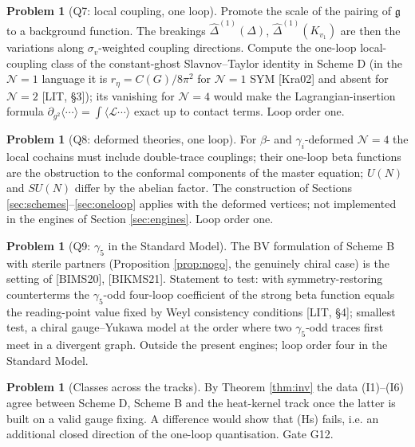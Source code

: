 \documentclass[11pt]{article}
\theoremstyle{definition}
\newtheorem{problem}[definition]{Problem}
\numberwithin{equation}{section}
\begin{document}
\begin{problem}[Q7: local coupling, one loop]
\label{q:Q7}
Promote the scale of the pairing of $\mathfrak g$ to a background function. The breakings $\widehat\Delta^{(1)}(\Delta)$, $\widehat\Delta^{(1)}(K_{v_1})$ are then the variations along $\sigma_v$-weighted coupling directions. Compute the one-loop local-coupling class of the constant-ghost Slavnov--Taylor identity in Scheme D (in the $\mathcal N=1$ language it is $r_\eta=C(G)/8\pi^2$ for $\mathcal N=1$ SYM [Kra02] and absent for $\mathcal N=2$ [LIT, §3]); its vanishing for $\mathcal N=4$ would make the Lagrangian-insertion formula $\partial_{g^2}\langle\cdots\rangle=\int\langle\mathscr L\cdots\rangle$ exact up to contact terms. Loop order one.
\end{problem}

\begin{problem}[Q8: deformed theories, one loop]
\label{q:Q8}
For $\beta$- and $\gamma_i$-deformed $\mathcal N=4$ the local cochains must include double-trace couplings; their one-loop beta functions are the obstruction to the conformal components of the master equation; $U(N)$ and $SU(N)$ differ by the abelian factor. The construction of Sections \ref{sec:schemes}--\ref{sec:oneloop} applies with the deformed vertices; not implemented in the engines of Section \ref{sec:engines}. Loop order one.
\end{problem}

\begin{problem}[Q9: $\gamma_5$ in the Standard Model]
\label{q:Q9}
The BV formulation of Scheme B with sterile partners (Proposition \ref{prop:nogo}, the genuinely chiral case) is the setting of [BIMS20], [BIKMS21]. Statement to test: with symmetry-restoring counterterms the $\gamma_5$-odd four-loop coefficient of the strong beta function equals the reading-point value fixed by Weyl consistency conditions [LIT, §4]; smallest test, a chiral gauge--Yukawa model at the order where two $\gamma_5$-odd traces first meet in a divergent graph. Outside the present engines; loop order four in the Standard Model.
\end{problem}

\begin{problem}[Classes across the tracks]
\label{q:classes}
By Theorem \ref{thm:inv} the data (I1)--(I6) agree between Scheme D, Scheme B and the heat-kernel track once the latter is built on a valid gauge fixing. A difference would show that (Hs) fails, i.e. an additional closed direction of the one-loop quantisation. Gate G12.
\end{problem}
\end{document}
